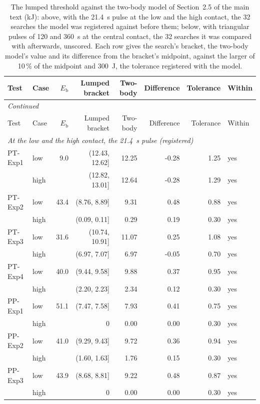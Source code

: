 {\footnotesize\setlength{\tabcolsep}{2.5pt}
\begin{longtable}{llrrrrrl}
\caption{The lumped threshold against the two-body model of Section~2.5 of the main text (kJ): above, with the 21.4~s pulse at the low and the high contact, the 32 searches the model was registered against before them; below, with triangular pulses of 120 and 360~s at the central contact, the 32 searches it was compared with afterwards, unscored. Each row gives the search's bracket, the two-body model's value and its difference from the bracket's midpoint, against the larger of 10\,\% of the midpoint and 300~J, the tolerance registered with the model.}\label{tab:s-twobody}\\
\toprule
Test & Case & $E_\mathrm{b}$ & Lumped bracket & Two-body & Difference & Tolerance & Within \\
\midrule
\endfirsthead
\multicolumn{8}{l}{\textit{Continued}} \\
\toprule
Test & Case & $E_\mathrm{b}$ & Lumped bracket & Two-body & Difference & Tolerance & Within \\
\midrule
\endhead
\multicolumn{8}{l}{\textit{At the low and the high contact, the 21.4~s pulse (registered)}} \\
PT-Exp1 & low & 9.0 & (12.43, 12.62] & 12.25 & -0.28 & 1.25 & yes \\
 & high &  & (12.82, 13.01] & 12.64 & -0.28 & 1.29 & yes \\
PT-Exp2 & low & 43.4 & (8.76, 8.89] & 9.31 & 0.48 & 0.88 & yes \\
 & high &  & (0.09, 0.11] & 0.29 & 0.19 & 0.30 & yes \\
PT-Exp3 & low & 31.6 & (10.74, 10.91] & 11.07 & 0.25 & 1.08 & yes \\
 & high &  & (6.97, 7.07] & 6.97 & -0.05 & 0.70 & yes \\
PT-Exp4 & low & 40.0 & (9.44, 9.58] & 9.88 & 0.37 & 0.95 & yes \\
 & high &  & (2.20, 2.23] & 2.34 & 0.12 & 0.30 & yes \\
PP-Exp1 & low & 51.1 & (7.47, 7.58] & 7.93 & 0.41 & 0.75 & yes \\
 & high &  & 0 & 0.00 & 0.00 & 0.30 & yes \\
PP-Exp2 & low & 41.0 & (9.29, 9.43] & 9.72 & 0.36 & 0.94 & yes \\
 & high &  & (1.60, 1.63] & 1.76 & 0.15 & 0.30 & yes \\
PP-Exp3 & low & 43.9 & (8.68, 8.81] & 9.22 & 0.48 & 0.87 & yes \\
 & high &  & 0 & 0.00 & 0.00 & 0.30 & yes \\

\end{longtable}}
